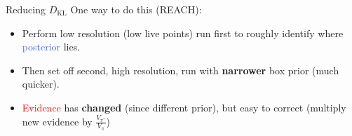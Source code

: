\documentclass[aspectratio=169, 11pt]{beamer}
\begin{document}


\appendix

\begin{frame}{Reducing $D_{\textrm{KL}}$}
\vspace{3.5em}
One way to do this (REACH):

\begin{minipage}[]{0.45\textwidth}\vspace{22em}
\end{minipage}
\begin{minipage}{0.45\textwidth}\vspace{-8em}
\begin{itemize}
    \item<1-> Perform low resolution (low live points) run first to roughly identify where \textcolor{RoyalBlue}{posterior} lies.
    \item<2-> Then set off second, high resolution, run with \textbf{narrower} box \textcolor{BurntOrange}{prior} (much quicker).
    \item<3-> \textcolor{red}{Evidence} has \textbf{changed} (since different prior), but easy to correct (multiply new evidence by $\frac{V_{\pi^\ast}}{V_\pi}$)
\end{itemize}
\end{minipage}

\end{frame}
\end{document}
